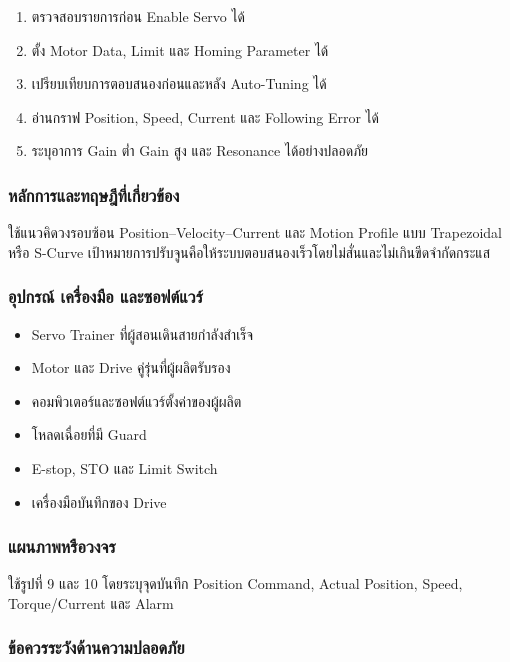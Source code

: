 \begin{enumerate}
    \item ตรวจสอบรายการก่อน Enable Servo ได้
    \item ตั้ง Motor Data, Limit และ Homing Parameter ได้
    \item เปรียบเทียบการตอบสนองก่อนและหลัง Auto-Tuning ได้
    \item อ่านกราฟ Position, Speed, Current และ Following Error ได้
    \item ระบุอาการ Gain ต่ำ Gain สูง และ Resonance ได้อย่างปลอดภัย
\end{enumerate}

\subsubsection{หลักการและทฤษฎีที่เกี่ยวข้อง}

ใช้แนวคิดวงรอบซ้อน Position–Velocity–Current และ Motion Profile แบบ Trapezoidal หรือ S-Curve เป้าหมายการปรับจูนคือให้ระบบตอบสนองเร็วโดยไม่สั่นและไม่เกินขีดจำกัดกระแส

\subsubsection{อุปกรณ์ เครื่องมือ และซอฟต์แวร์}

\begin{itemize}
    \item Servo Trainer ที่ผู้สอนเดินสายกำลังสำเร็จ
    \item Motor และ Drive คู่รุ่นที่ผู้ผลิตรับรอง
    \item คอมพิวเตอร์และซอฟต์แวร์ตั้งค่าของผู้ผลิต
    \item โหลดเฉื่อยที่มี Guard
    \item E-stop, STO และ Limit Switch
    \item เครื่องมือบันทึกของ Drive
\end{itemize}

\subsubsection{แผนภาพหรือวงจร}

ใช้รูปที่ 9 และ 10 โดยระบุจุดบันทึก Position Command, Actual Position, Speed, Torque/Current และ Alarm

\subsubsection{ข้อควรระวังด้านความปลอดภัย}

